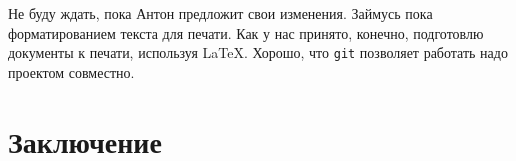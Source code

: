 \documentclass[14pt,a4paper]{article}
\begin{document}

 Не буду ждать, пока Антон предложит свои изменения. Займусь
пока форматированием текста для печати. Как у нас принято, конечно, подготовлю документы к печати,
используя \LaTeX. Хорошо, что \texttt{git} позволяет работать надо проектом совместно. 

 
\section{Заключение}
\end{document}
